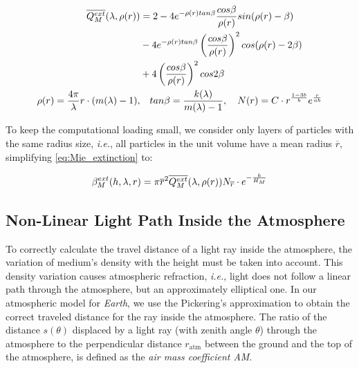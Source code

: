 \documentclass[journal]{vgtc}                %
\newcommand{\review}[1]{{\color{blue}#1}}
\begin{document}
\vspace*{-3mm}
{
  \small
\begin{align}
\overline{Q_{M}^{ext}}(\lambda, \rho(r)) &= 2 - 4e^{-\rho(r) tan\beta}\frac{cos\beta}{\rho(r)}sin(\rho(r)-\beta) \notag\\
&- 4e^{-\rho(r)tan\beta}\left(\frac{cos\beta}{\rho(r)}\right)^2cos(\rho(r)-2\beta) \notag\\
&+ 4\left(\frac{cos\beta}{\rho(r)}\right)^2cos2\beta\label{eq:mie_ext_efficiency}\\
\rho(r) = \frac{4\pi}{\lambda}r\cdot(m(\lambda) - 1), &\quad tan\beta = \frac{k(\lambda)}{m(\lambda) - 1}, \quad
N(r) = C \cdot r^{\frac{1-3b}{b}}e^{\frac{r}{ab}} \notag
\label{eq:particle_distribution}
\end{align}
}
\vspace*{-4mm}

To keep the computational loading small, we consider only layers of particles with the same radius size, \textit{i.e.}, all particles in the unit volume have a mean radius $\overline{r}$, simplifying \autoref{eq:Mie_extinction} to:

\vspace*{-1.5mm}
\begin{equation}\label{eq:final_mie_ext}
  \small
  \beta_M^{ext}(h, \lambda, r) = \pi {\overline{r}}^2 \overline{Q_{M}^{ext}}(\lambda, \rho(r))N_{\overline{r}} \cdot e^{-\frac{h}{H_M}}
\end{equation}
\vspace*{-4.5mm}

\subsection{Non-Linear Light Path Inside the Atmosphere}\label{section:nlp}

To correctly calculate the travel distance of a light ray inside the atmosphere, the variation of medium's density with the height must be taken into account. This density variation causes atmospheric refraction, \textit{i.e.}, light does not follow a linear path through the atmosphere, but an approximately elliptical one. In our atmospheric model for \textit{Earth}, we use the Pickering's approximation \cite{Pickering:2002} to obtain the correct traveled distance for the ray inside the atmosphere. \review{The ratio of the distance $s(\theta)$ displaced by a light ray (with zenith angle $\theta$) through the atmosphere to the perpendicular distance $r_{\text{atm}}$ between the ground and the top of the atmosphere, is defined as the \textit{air mass coefficient AM}}.
\end{document}
